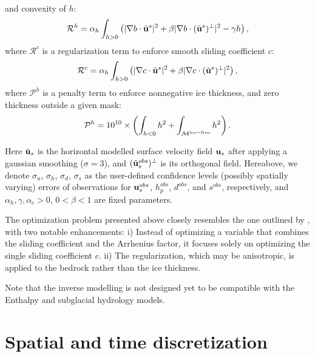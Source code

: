 \documentclass[10pt,twocolumn]{article}
\begin{document}
and convexity of $h$:
\begin{align}
\mathcal{R}^h=\alpha_h\int_{h>0}\left(|\nabla b \cdot \tilde{{\bf u}}^{s} |^2+\beta|\nabla b \cdot (\tilde{{\bf u}}^{s})^{\perp} |^2-\gamma h\right),
\end{align}
where $\mathcal{R}^{c}$ is a regularization term to enforce smooth sliding coefficient $c$:
\begin{align}
\mathcal{R}^c=\alpha_h\int_{h>0}\left(|\nabla c \cdot \tilde{{\bf u}}^{s} |^2+\beta|\nabla c \cdot (\tilde{{\bf u}}^{s})^{\perp} |^2 \right),
\end{align}
where $\mathcal{P}^h$ is a penalty term to enforce nonnegative ice thickness, 
and zero thickness outside a given mask:
\begin{align}
\mathcal{P}^h=10^{10} \times \left(\int_{h<0} h^2+\int_{\mathcal{M}^{\rm ice-free}} h^2 \right).
\end{align}

Here $\tilde{{\bf u}}_s$ is the horizontal modelled surface velocity 
field ${\bf u}_s$ after applying a gaussian smoothing ($\sigma=3$),
 and $(\tilde{{\bf u}}_s^{obs})^{\perp}$ is its orthogonal field. 
Hereabove, we denote $\sigma_u$, $\sigma_h$, $\sigma_d$, $\sigma_s$ 
as the user-defined confidence levels (possibly spatially varying) 
errors of observations for ${\bf u}_s^{obs}$, $h_p^{obs}$, $d^{obs}$, and $s^{obs}$, 
respectively, and $\alpha_h, \gamma, \alpha_c>0$, $0<\beta<1$ are fixed parameters.

The optimization problem presented above closely resembles the one outlined 
by \citet{jouvet2023inversion}, with two notable enhancements:
i) Instead of optimizing a variable that combines the sliding coefficient 
and the Arrhenius factor, it focuses solely on optimizing the single sliding coefficient $c$.
ii) The regularization, which may be anisotropic, 
is applied to the bedrock rather than the ice thickness.

Note that the inverse modelling is not designed yet to be compatible with 
the Enthalpy and subglacial hydrology models.
 
\section{Spatial and time discretization} 
\label{sec_discretization}
\end{document}
